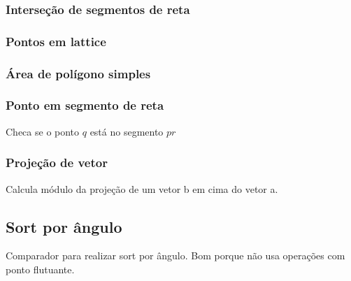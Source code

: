 \subsubsection{Interse\c{c}\~{a}o de segmentos de reta}
\divisor

\subsubsection{Pontos em lattice}
\divisor

\subsubsection{\'{A}rea de pol\'{i}gono simples}
\divisor

\subsubsection{Ponto em segmento de reta}
Checa se o ponto $q$ est\'{a} no segmento $pr$
\divisor

\subsubsection{Proje\c{c}\~{a}o de vetor}
Calcula m\'{o}dulo da proje\c{c}\~{a}o de um vetor b em cima do vetor a.
\divisor

\subsection{Sort por \^{a}ngulo}
Comparador para realizar sort por \^{a}ngulo. Bom porque n\~{a}o usa opera\c{c}\~{o}es com ponto flutuante.
\divisor
